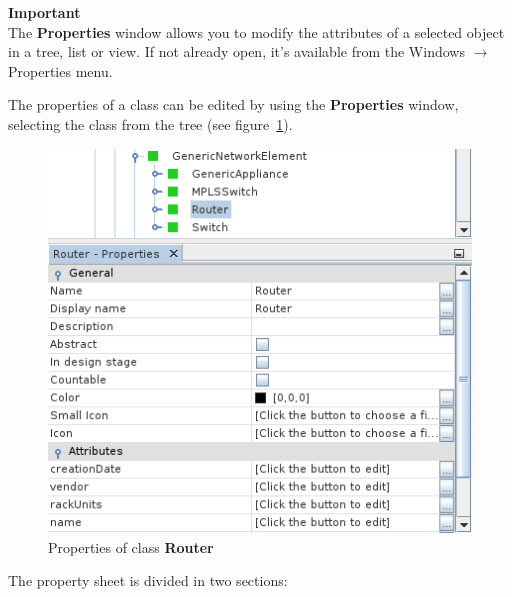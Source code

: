 \documentclass[a4paper]{article}
\begin{document}
		\begin{framed} {\large \textbf{Important}} \\
				The \textbf{Properties} window allows you to modify the attributes of a selected object in a tree, list or view. If not already open, it's available from the Windows $\rightarrow$ Properties menu.
		\end{framed}
		The properties of a class can be edited by using the \textbf{Properties} window, selecting the class from the tree (see figure~\ref{fig:properties_class_node}). 
		\begin{figure}[h!]
			\centering
			\includegraphics[width=0.5\linewidth]{img/properties_class_node.png}
			\caption{Properties of class \textbf{Router}}
			\label{fig:properties_class_node}
		\end{figure}
		The  property  sheet  is  divided  in  two  sections: 
\end{document}
